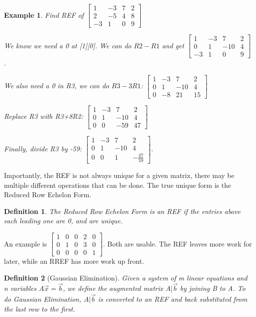 \documentclass{article}
\newtheorem{definition}{Definition}
\newtheorem{example}{Example}
\begin{document}
\begin{example}
	Find REF of $\begin{bmatrix}1&-3&7&2\\2&-5&4&8\\-3&1&0&9\end{bmatrix}$

	We know we need a 0 at [1][0]. We can do $R2-R1$ and get $\begin{bmatrix}
	1&-3&7&2\\0&1&-10&4\\-3&1&0&9\end{bmatrix}$.

	We also need a 0 in R3, we can do $R3-3R1$: $\begin{bmatrix} 1&-3&7&2\\0&1&-10&4\\0&-8&21&15\end{bmatrix}$

	Replace R3 with R3+8R2:  $\begin{bmatrix} 1&-3&7&2\\ 0&1&-10&4\\0&0&-59&47\end{bmatrix}$
	
	Finally, divide R3 by -59: $\begin{bmatrix} 1&-3&7&2\\ 0&1&-10&4\\0&0&1&-\frac{47}{59}\end{bmatrix}$. 
\end{example}

Importantly, the REF is not always unique for a given matrix, there may be multiple different operations that can be done. 
The true unique form is the Reduced Row Echelon Form.
\begin{definition}
	The Reduced Row Echelon Form is an REF if the entries above each leading one are 0, and are unique.
\end{definition}

An example is $\begin{bmatrix}1&0&0&2&0\\0&1&0&3&0\\0&0&0&0&1\end{bmatrix}$. 
Both are usable. The REF leaves more work for later, while an RREF has more work up front.

\begin{definition}[Gaussian Elimination]
	Given a system of m linear equations and n variables $A\vec{x}=\vec{b}$, we define the augmented matrix
	$A|\vec{b}$ by joining B to A. To do Gaussian Elimination, $A|\vec{b}$ is converted to an REF and back substituted from the last row to the first.
\end{definition}
\end{document}
